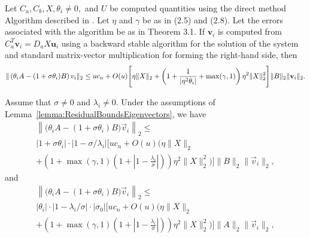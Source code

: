 \begin{lemma}
\label{lemma:ResidualBoundsEigenvectors}
		Let $C_a, C_b, X, \theta_i \neq 0,$ and $U$ be computed quantities using the direct method Algorithm described in \cite{stewart2024spectraltransformationdensesymmetric}. Let $\eta$ and $\gamma$ be as in (2.5) and (2.8). Let the errors associated with the algorithm be as in Theorem 3.1. If $\mathbf{v}_i$ is computed from $C_a^T \mathbf{v}_i = D_a X \mathbf{u}_i$ using a backward stable algorithm for the solution of the system and standard matrix-vector multiplication for forming the right-hand side, then
		\[
		\| \left( \theta_i A - (1 + \sigma \theta_i) B \right) v_i \|_2 \leq u c_n + O(u) \Bigg[ \eta \| X \|_2 \\
		+ \left( 1 + \frac{1}{| \eta^2 \theta_i |} + \max(\gamma, 1) \right) \eta^2 \| X \|_2^2 \Bigg] \| B \|_2 \| \mathbf{v}_i \|_2.\]
\end{lemma}

\begin{theorem}\label{thrm:ResidualBounds}
	Assume that $\sigma\neq 0$ and $\lambda_i\neq 0$.  Under the assumptions of Lemma~\ref{lemma:ResidualBoundsEigenvectors}, we have
	\begin{multline*}
		\left\| \big(\theta_i A - (1+\sigma \theta_i) B\big) \vec{v}_i \right\|_2
		\leq \\
		|1+\sigma \theta_i| \cdot |1-\sigma/\lambda_i| \Bigg[
		uc_n +O(u)\Bigg( \eta\|X\|_2 \\
		+ \left(1 + \max(\gamma, 1)
		\left(1+ \left| 1 - \frac{\lambda_i}{\sigma}\right|\right)\right)
		\eta^2\|X\|_2^2 \Bigg) \Bigg] \|B\|_2 \|\vec{v}_i\|_2,
	\end{multline*}
	and
	\begin{multline*}
		\left\| \big(\theta_i A - (1+\sigma \theta_i) B\big) \vec{v}_i \right\|_2
		\leq \\
		|\theta_i| \cdot |1-\lambda_i/\sigma| \cdot |\sigma_0| \Bigg[
		uc_n +O(u)\Bigg( \eta\|X\|_2 \\
		+ \left(1 + \max(\gamma, 1) \left(1+ \left| 1
		- \frac{\lambda_i}{\sigma}\right|\right)\right)
		\eta^2\|X\|_2^2 \Bigg) \Bigg] \|A\|_2 \|\vec{v}_i\|_2,
	\end{multline*}
\end{theorem}

